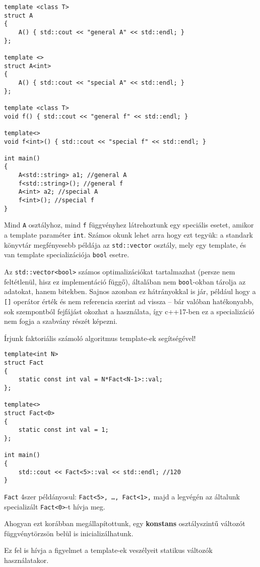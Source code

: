 \documentclass[a4paper,11.5pt,table]{article}
\begin{document}
	\begin{lstlisting}
template <class T>
struct A
{
	A()	{ std::cout << "general A" << std::endl; }
};

template <>
struct A<int>
{
	A() { std::cout << "special A" << std::endl; }
};

template <class T>
void f() { std::cout << "general f" << std::endl; }

template<>
void f<int>() { std::cout << "special f" << std::endl; }

int main() 
{
	A<std::string> a1; //general A
	f<std::string>(); //general f
	A<int> a2; //special A
	f<int>(); //special f
}
	\end{lstlisting}
	Mind \texttt{A} osztályhoz, mind \texttt{f} függvényhez látrehoztunk egy speciális esetet, amikor a template paraméter \texttt{int}. Számos okunk lehet arra hogy ezt tegyük: a standark könyvtár megfényesebb példája az \texttt{std::vector} osztály, mely egy template, és van template specializációja \texttt{bool} esetre.
	\begin{note}
		Az \texttt{std::vector<bool>} számos optimalizációkat tartalmazhat (persze nem feltétlenül, hisz ez implementáció függő), általában nem \texttt{bool}-okban tárolja az adatokat, hanem bitekben. Sajnos azonban ez hátrányokkal is jár, például hogy a \texttt{[]} operátor érték és nem referencia szerint ad vissza -- bár valóban hatékonyabb, sok szempontból fejfájást okozhat a használata, így c++17-ben ez a specializáció nem fogja a szabvány részét képezni.
	\end{note}
	Írjunk faktoriális számoló algoritmus template-ek segítségével!
	\begin{lstlisting}
template<int N>                           
struct Fact 
{                             
	static const int val = N*Fact<N-1>::val;
};

template<>                                
struct Fact<0>
{                          
	static const int val = 1;               
};               

int main() 
{                                          
	std::cout << Fact<5>::val << std::endl; //120
}
	\end{lstlisting}
	\texttt{Fact} 4szer példányosul: \texttt{Fact<5>, \ldots, Fact<1>,} majd a legvégén az általunk specializált \texttt{Fact<0>}-t hívja meg.
	\begin{note}
		Ahogyan ezt korábban megállapítottunk, egy \textbf{konstans} osztályszintű változót függvénytörzsön belül is inicializálhatunk.
	\end{note}
	Ez fel is hívja a figyelmet a template-ek veszélyeit statikus változók használatakor.
	
\end{document}

